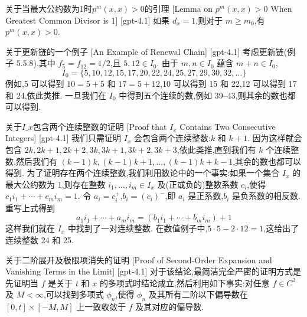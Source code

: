 \documentclass[UTF8]{ctexart}
\begin{document}
    \begin{lma}
        {关于当最大公约数为1时$p^{m}(x, x) > 0$的引理}
        [Lemma on $p^{m}(x, x) > 0$ When Greatest Common Divisor is 1]
        [gpt-4.1]
        如果 $d_{x} = 1$,则对于 $m \geq m_{0}$,有 $p^{m}(x, x) > 0$.
    \end{lma}
    
    
    
    \begin{xmp}
        {关于更新链的一个例子}
        [An Example of Renewal Chain]
        [gpt-4.1]
        考虑更新链(例子 5.5.8),其中 $f_{5} = f_{12} = 1/2$,且 $5, 12 \in I_{0}$.
由于 $m, n \in I_{0}$ 蕴含 $m+n \in I_{0}$,
\[
I_{0} = \{ 5, 10, 12, 15, 17, 20, 22, 24, 25, 27, 29, 30, 32, \ldots \}
\]
例如,5 可以得到 $10 = 5+5$ 和 $17 = 5+12$,10 可以得到 15 和 22,12 可以得到 17 和 24,依此类推.
一旦我们在 $I_{0}$ 中得到五个连续的数,例如 39–43,则其余的数也都可以得到.
    \end{xmp}
    
    
    
    \begin{prf}
        {关于$I\_{x}$包含两个连续整数的证明}
        [Proof that $I_x$ Contains Two Consecutive Integers]
        [gpt-4.1]
        我们只需证明 $I_{x}$ 会包含两个连续整数:$k$ 和 $k+1$.
因为这样就会包含 $2k, 2k+1, 2k+2, 3k, 3k+1, 3k+2, 3k+3$,依此类推,直到我们有 $k$ 个连续整数,然后我们有 $(k-1)k, (k-1)k+1, \ldots, (k-1)k+k-1$,其余的数也都可以得到.
为了证明存在两个连续整数,我们利用数论中的一个事实:如果一个集合 $I_{x}$ 的最大公约数为 $1$,则存在整数 $i_{1}, \ldots, i_{m} \in I_{x}$ 及(正或负的)整数系数 $c_{i}$,使得 $c_{1}i_{1} + \cdots + c_{m}i_{m} = 1$.
令 $a_{i} = c_{i}^{+}$,$b_{i} = (c_{i})^{-}$,即 $a_{i}$ 是正系数,$b_{i}$ 是负系数的相反数.
重写上式得到
\[
a_{1}i_{1} + \cdots + a_{m}i_{m} = (b_{1}i_{1} + \cdots + b_{m}i_{m}) + 1
\]
这样我们就在 $I_{x}$ 中找到了一对连续整数.
在数值例子中,$5 \cdot 5 - 2 \cdot 12 = 1$,这给出了连续整数 24 和 25.
    \end{prf}
    
    
    
    \begin{prf}
        {关于二阶展开及极限项消失的证明}
        [Proof of Second-Order Expansion and Vanishing Terms in the Limit]
        [gpt-4.1]
        对于该结论,最简洁完全严密的证明方式是先证明当 $f$ 是关于 $t$ 和 $x$ 的多项式时结论成立,然后利用如下事实:对任意 $f \in C^{2}$ 及 $M < \infty$,可以找到多项式 $\phi_{n}$,使得 $\phi_{n}$ 及其所有二阶以下偏导数在 $[0, t] \times [-M, M]$ 上一致收敛于 $f$ 及其对应的偏导数.
    \end{prf}
    
\end{document}

